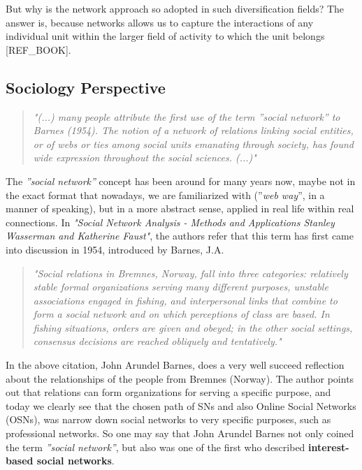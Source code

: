 \indent But why is the network approach so adopted in such diversification fields? The answer is, because networks allows us to capture the interactions of any individual unit within the larger field of activity to which the unit belongs [REF\_BOOK].


\subsection{Sociology Perspective}
\begin{quote}
\textit{"(...) many people attribute the first use of the term ''social network'' to
Barnes (1954). The notion of a network of relations linking social entities, or of webs or ties among social units emanating through society, has
found wide expression throughout the social sciences. (...)"}
\end{quote}

The \textit{''social network''} concept has been around for many years now, maybe not in the exact format that nowadays, we are familiarized with (''\textit{web way}'', in a manner of speaking), but in a more abstract sense, applied in real life within real connections.
In \textit{"Social Network Analysis - Methods and Applications Stanley Wasserman and Katherine Faust"}, the authors refer that this term has first came into discussion in 1954, introduced by Barnes, J.A.

\begin{quote}
\textit{"Social relations in Bremnes, Norway, fall into three categories: relatively stable formal organizations serving many different
purposes, unstable associations engaged in fishing, and interpersonal links that combine to form a social
network and on which perceptions of class are based. In fishing situations, orders are given and
obeyed; in the other social settings, consensus decisions are reached obliquely and tentatively."}
\end{quote}

In the above citation, John Arundel Barnes, does a very well succeed reflection about the relationships of the people from Bremnes (Norway). The author points out that relations can form organizations for serving a specific purpose, and today we clearly see that the chosen path of SNs and also Online Social Networks (OSNs), was narrow down social networks to very specific purposes, such as professional networks. So one may say that John Arundel Barnes not only coined the term \textit{''social network''}, but also was one of the first who described \textbf{interest-based social networks}.

